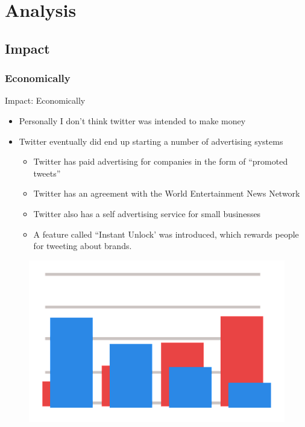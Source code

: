 \documentclass[xcolor=svgnames,handout]{beamer}
\begin{document}
\section{Analysis}

\subsection{Impact}

\subsubsection{Economically}
\begin{frame}{Impact: Economically}
	\begin{itemize}
		\item Personally I don't think twitter was intended to make money
		\item Twitter eventually did end up starting a number of advertising systems
			\begin{itemize}
				\item Twitter has paid advertising for companies in the form of ``promoted tweets''~\cite{charlesarthur2010}~\cite{sarakimberley2010}
				\item Twitter has an agreement with the World Entertainment News Network~\cite{olivierlaurent2011}
				\item Twitter also has a self advertising service for small businesses~\cite{todowasserman2011}~\cite{zachminers2013}~\cite{todowasserman2012}
				\item A feature called ``Instant Unlock' was introduced, which rewards people for tweeting about brands.~\cite{martyswant2016}
			\end{itemize}
	\end{itemize}
	\begin{figure}[h]
		\centering
		\includegraphics[scale=0.15]{clipartgraph.png}
		\caption{\cite{artsybeeUnknown}}
	\end{figure}
\end{frame}
\end{document}
